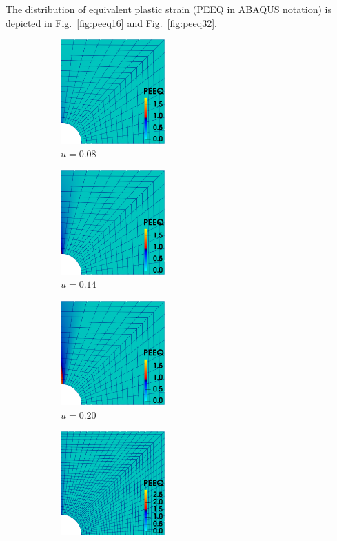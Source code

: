 \documentclass[3p,sort&compress,11pt,fleqn]{elsarticle}
\newcommand*{\figref}[1]{Fig.~\ref{#1}}
\begin{document}
The distribution of equivalent plastic strain (PEEQ in ABAQUS notation) is depicted in \figref{fig:peeq16} and \figref{fig:peeq32}.
\begin{figure}[ht]
\centering\footnotesize
\begin{subfigure}[b]{.33\textwidth}\centering
\includegraphics[width=4cm]{PIC/P1640}
\caption{$u=\num{0.08}$}
\end{subfigure}\hfill
\begin{subfigure}[b]{.33\textwidth}\centering
\includegraphics[width=4cm]{PIC/P1670}
\caption{$u=\num{0.14}$}
\end{subfigure}\hfill
\begin{subfigure}[b]{.33\textwidth}\centering
\includegraphics[width=4cm]{PIC/P16100}
\caption{$u=\num{0.20}$}
\end{subfigure}
\caption{distribution of equivalent plastic strain (16 elements per edge)}\label{fig:peeq16}
\begin{subfigure}[b]{.33\textwidth}\centering
\includegraphics[width=4cm]{PIC/P3240}

\end{subfigure}
\end{figure}
\end{document}
